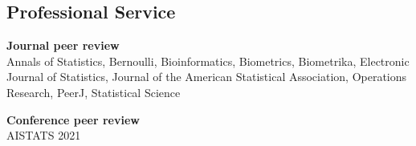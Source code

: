 \documentclass[margin,line]{res}
\newcommand{\ver}{\vspace*{-2.7mm}}
\begin{document}
\begin{resume}
\section{\sc Professional Service}

\textbf{Journal peer review}\\
Annals of Statistics, Bernoulli, Bioinformatics, Biometrics, Biometrika, Electronic Journal of Statistics, Journal of the American Statistical Association, Operations Research, PeerJ, Statistical Science

\ver
\textbf{Conference peer review}\\
AISTATS 2021








\end{resume}
\end{document}
